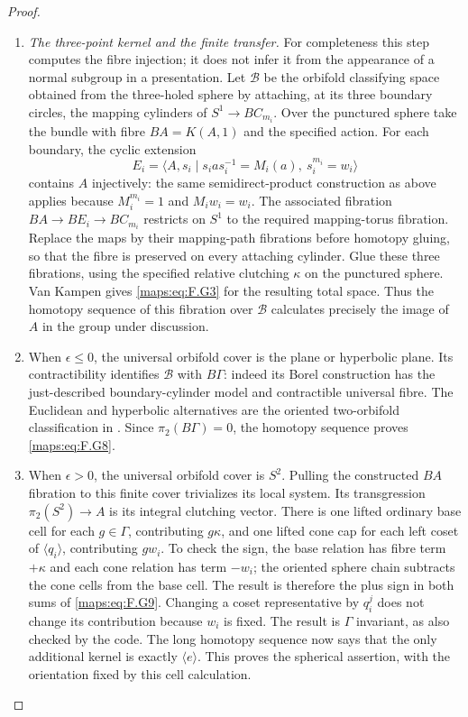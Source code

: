 \begin{proof}
\begin{enumerate}[label=\arabic*.]
\item \emph{The three-point kernel and the finite transfer.}
For completeness this step computes the fibre injection; it
does not infer it from the appearance of a normal subgroup in
a presentation.  Let $\mathcal B$ be the orbifold classifying
space obtained from the three-holed sphere by attaching, at
its three boundary circles, the mapping cylinders of
$S^1\to BC_{m_i}$.  Over the punctured sphere take the bundle
with fibre $BA=K(A,1)$ and the specified action.  For each
boundary, the cyclic extension
\[
 E_i=\langle A,s_i\mid s_i a s_i^{-1}=M_i(a),\ s_i^{m_i}=w_i\rangle
\]
contains $A$ injectively: the same semidirect-product construction
as above applies because $M_i^{m_i}=1$ and $M_iw_i=w_i$.
The associated fibration $BA\to BE_i\to BC_{m_i}$ restricts
on $S^1$ to the required mapping-torus fibration.  Replace the
maps by their mapping-path fibrations before homotopy gluing,
so that the fibre is preserved on every attaching cylinder.
Glue these three fibrations, using the specified relative clutching
$\kappa$ on the punctured sphere.  Van Kampen gives \eqref{maps:eq:F.G3}
for the resulting total space.  Thus the homotopy sequence
of this fibration over $\mathcal B$ calculates precisely
the image of $A$ in the group under discussion.

\item When $\epsilon\le0$, the universal orbifold cover is the plane
or hyperbolic plane.  Its contractibility identifies
$\mathcal B$ with $B\Gamma$: indeed its Borel construction
has the just-described boundary-cylinder model and contractible
universal fibre.  The Euclidean and hyperbolic alternatives
are the oriented two-orbifold classification in
\cite[Theorems 2.3--2.4, p.~425; Euler-characteristic comparison, pp.~427--428]{rootScott83}.
Since $\pi_2(B\Gamma)=0$, the homotopy sequence proves \eqref{maps:eq:F.G8}.

\item When $\epsilon>0$, the universal orbifold cover is $S^2$.
Pulling the constructed $BA$ fibration to this finite cover
trivializes its local system.  Its transgression
$\pi_2(S^2)\to A$ is its integral clutching vector.
There is one lifted ordinary base cell for each $g\in\Gamma$,
contributing $g\kappa$, and one lifted cone cap for each left
coset of $\langle q_i\rangle$, contributing $gw_i$.
To check the sign, the base relation has fibre term $+\kappa$
and each cone relation has term $-w_i$; the oriented sphere
chain subtracts the cone cells from the base cell.  The result
is therefore the plus sign in both sums of \eqref{maps:eq:F.G9}.
Changing a coset representative by $q_i^j$ does not change
its contribution because $w_i$ is fixed.  The result is
$\Gamma$ invariant, as also checked by the code.  The long
homotopy sequence now says that the only additional kernel
is exactly $\langle e\rangle$.  This proves the spherical
assertion, with the orientation fixed by this cell calculation.


\end{enumerate}
\end{proof}
